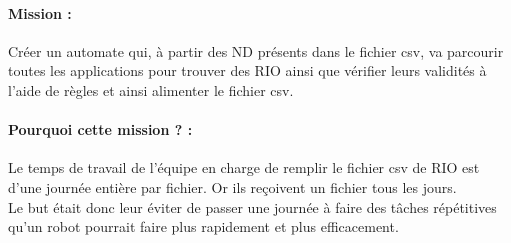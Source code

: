 \documentclass[a4paper,twoside,12pt,openright]{report}
\begin{document}
\paragraph {Mission :}
Créer un automate qui, à partir des ND présents dans le fichier csv, va parcourir toutes les applications pour trouver des RIO ainsi que vérifier leurs validités à l'aide de règles et ainsi alimenter le fichier csv.\\
\paragraph {Pourquoi cette mission ? :} 
Le temps de travail de l'équipe en charge de remplir le fichier csv de RIO est d'une journée entière par fichier. Or ils reçoivent un fichier tous les jours.\\
Le but était donc leur éviter de passer une journée à faire des tâches répétitives qu'un robot pourrait faire plus rapidement et plus efficacement.
\end{document}
